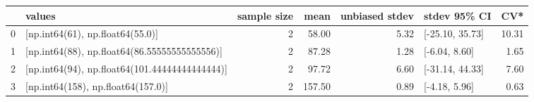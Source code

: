 \begin{tabular}{llrrrlr}
\toprule
 & values & sample size & mean & unbiased stdev & stdev 95\% CI & CV* \\
\midrule
0 & [np.int64(61), np.float64(55.0)] & 2 & 58.00 & 5.32 & [-25.10, 35.73] & 10.31 \\
1 & [np.int64(88), np.float64(86.55555555555556)] & 2 & 87.28 & 1.28 & [-6.04, 8.60] & 1.65 \\
2 & [np.int64(94), np.float64(101.44444444444444)] & 2 & 97.72 & 6.60 & [-31.14, 44.33] & 7.60 \\
3 & [np.int64(158), np.float64(157.0)] & 2 & 157.50 & 0.89 & [-4.18, 5.96] & 0.63 \\
\bottomrule
\end{tabular}
